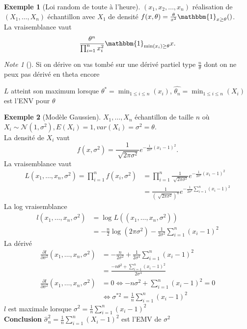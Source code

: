 \documentclass{article}
\theoremstyle{plain}%
\theoremstyle{definition}
\newtheorem{exmp}{Exemple}[section]
\theoremstyle{remark}
\newtheorem*{note}{Note}
\begin{document}
\begin{exmp}[Loi random de toute à l'heure]
    $ (x_1,x_2,\dots,x_n) $ réalisation de $(X_1,\dots, X_n)$ échantillon avec $ X_1 $ de densité $ f(x, \theta ) = \frac{\theta }{x^2}\mathbbm{1}_{x \geq \theta }() $. \\ 
    La vraisemblance vaut 
    \[
        \frac{\theta ^n}{\prod_{i=1}^{n}x_i^2} \mathbbm{1}_{\min (x_i) \geq \theta }x
    .\]
    \begin{note}[]
        Si on dérive on vas tombé sur une dérivé partiel type $ \frac{n}{\theta } $ dont on ne peux pas dérivé en theta encore 
    \end{note}
    $ L $ atteint son maximum lorsque $ \theta ^* = \min_{1 \leq i \leq n}(x_i) $, $ \hat{\theta _n} = \min _{1 \leq i \leq n} (X_i) $ est l'ENV pour $ \theta  $  
    
\end{exmp}

\begin{exmp}[Modèle Gaussien]
    $ X_1, \dots, X_n $ échantillon de taille $ n $ où $ X_i \sim \mathcal{N}(1, \sigma ^2), E(X_i) = 1, var(X_i) = \sigma ^2 = \theta $. \\
    La densité de $ X_i $ vaut 
    \[
        f(x, \sigma ^2) = \frac{1}{\sqrt[]{2 \pi \sigma ^2}}e^{- \frac{1}{2 \sigma ^2}(x_1 - 1)^2}
    .\]
    La vraisemblance vaut \begin{align*}
        L(x_1,\dots,x_n, \sigma ^2) = \prod_{i=1}^{n}f(x_i, \sigma ^2) &= \prod_{i=1}^{n}\frac{1}{\sqrt[]{2 \pi  \sigma ^2}}e^{- \frac{1}{2 \sigma ^2}(x_1 -1)^2}  \\
        &= \frac{1}{(\sqrt[]{2 \pi \sigma ^2})^n} e^{-\frac{1}{2 \sigma ^2} \sum_{i=1}^{n}(x_i-1)^2}
    \end{align*}
    La log vraisemblance 
    \begin{align*}
        l(x_1,\dots,x_n, \sigma ^2) &= \log_{} L((x_1,\dots,x_n, \sigma ^2)) \\
        &= - \frac{n}{2} \log_{} (2 \pi \sigma ^2) - \frac{1}{2 \sigma ^2} \sum_{i=1}^{n}(x_i-1)^2        
    \end{align*}
    La dérivé \begin{align*}
        \frac{\partial l}{\partial \sigma ^2}(x_1,\dots,x_n, \sigma ^2) &= - \frac{n}{2 \sigma ^2} + \frac{1}{2 \sigma ^4} \sum_{i=1}^{n} (x_i -1) ^2\\
        &= \frac{-n \theta ^2 + \sum_{i=1}^{n}(x_i -1)^2}{2 \sigma ^4} \\
        \frac{\partial l}{\partial \sigma ^2}(x_1,\dots,x_n, \sigma ^2) &= 0 \Leftrightarrow -n \sigma ^2 + \sum_{i=1}^{n}(x_i -1)^2 = 0 \\
        & \Leftrightarrow \sigma^{*2} = \frac{1}{n}\sum_{i=1}^{n}(x_i-1) ^2
    \end{align*}
    $ l $ est maximale lorsque $ \sigma ^2 = \frac{1}{n}\sum_{i=1}^{n}(x_i-1)^2 $ \\
    \textbf{Conclusion} $ \hat{\sigma }^2_n = \frac{1}{n}\sum_{i=1}^{n}(X_i -1)^2 $ est l'EMV de $\sigma ^2$
\end{exmp}
\end{document}
